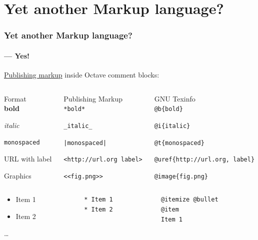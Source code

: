 \documentclass[xcolor=svgnames]{beamer}
\begin{document}
\section{Yet another Markup language?}



\begin{frame}[fragile]
\frametitle{Yet another Markup language?}
\framesubtitle{--- Yes!}

\href{https://www.gnu.org/software/octave/doc/interpreter/Publishing-Markup.html}{Publishing markup}
inside Octave comment blocks:\\[1em]

\scriptsize
\begin{columns}
\begin{column}{.2\textwidth}
{\color{blue}Format}  \\[1em]

\textbf{bold}

\textit{italic}

\texttt{monospaced}

URL with label

Graphics
\end{column}
\begin{column}{.3\textwidth}
{\color{blue}Publishing Markup} \\[1em]

\lstinline|*bold*|

\lstinline|_italic_|

\lstinline{|monospaced|}

\lstinline|<http://url.org label>|

\lstinline|<<fig.png>>|
\end{column}
\begin{column}{.3\textwidth}
{\color{blue}GNU Texinfo} \\[1em]

\lstinline|@b{bold}|

\lstinline|@i{italic}|

\lstinline|@t{monospaced}|

\lstinline|@uref{http://url.org, label}|

\lstinline|@image{fig.png}|
\end{column}
\end{columns}

\begin{columns}
\begin{column}{.2\textwidth}
\begin{itemize}
\item Item 1
\item Item 2
\end{itemize}
\ldots
\end{column}
\begin{column}{.3\textwidth}
\begin{lstlisting}
* Item 1
* Item 2
\end{lstlisting}
\end{column}
\begin{column}{.3\textwidth}
\begin{lstlisting}
@itemize @bullet
@item
Item 1


\end{lstlisting}
\end{column}
\end{columns}
\end{frame}
\end{document}
